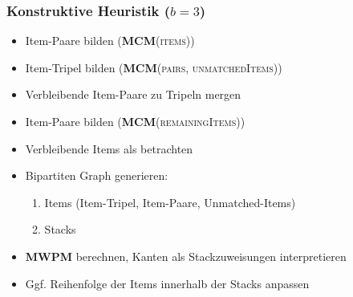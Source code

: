 \documentclass{beamer}
\begin{document}
\begin{frame}
\frametitle{Konstruktive Heuristik ($b = 3$)}

\begin{itemize}
  \item Item-Paare bilden (\textsc{\textbf{MCM}(items)})
  \item Item-Tripel bilden (\textsc{\textbf{MCM}(pairs, unmatchedItems)})
  \item Verbleibende Item-Paare zu Tripeln mergen
  \item Item-Paare bilden (\textsc{\textbf{MCM}(remainingItems)})
  \item Verbleibende Items als  betrachten
  \item Bipartiten Graph generieren:
  \begin{enumerate}
    \item Items (Item-Tripel, Item-Paare, Unmatched-Items)
    \item Stacks
  \end{enumerate}
  \item \textsc{\textbf{MWPM}} berechnen, Kanten als Stackzuweisungen interpretieren
  \item Ggf. Reihenfolge der Items innerhalb der Stacks anpassen
\end{itemize}
\end{frame}
\end{document}
